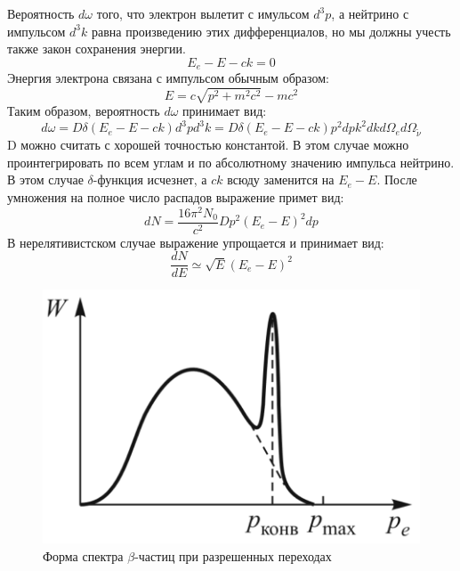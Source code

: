 \documentclass[a4paper, 12pt]{article}
\begin{document}
		Вероятность $d\omega$ того, что электрон вылетит с имульсом $d^3p$, а нейтрино с импульсом $d^3k$ равна произведению этих дифференциалов, но мы должны учесть также закон сохранения энергии.
		\begin{equation}
		    E_e - E - ck = 0
		\end{equation}
		Энергия электрона связана с импульсом обычным образом:
		\begin{equation}
			\label{pToEConversion}
		    E = c\sqrt{p^2 + m^2c^2} -mc^2
		\end{equation}
		Таким образом, вероятность $d\omega$ принимает вид:
		\begin{equation}
		    d\omega = D\delta(E_e-E-ck)d^3pd^3k = D\delta(E_e-E-ck)p^2d pk^2d kd\Omega_ed\Omega_{\widetilde{\nu}}
		\end{equation}
		D можно считать с хорошей точностью константой. В этом случае можно проинтегрировать по всем углам и по абсолютному значению импульса нейтрино. В этом случае $\delta$-функция исчезнет, а $ck$ всюду заменится на $E_e-E$. После умножения на полное число распадов выражение примет вид:
		\begin{equation}
		    d N = \frac{16\pi^2N_0}{c^2} D p^2\left(E_e-E\right)^2d p
		\end{equation}
		В нерелятивистском случае выражение упрощается и принимает вид:
		\begin{equation}
			\frac{d N}{d E} \simeq \sqrt{E}(E_e - E)^2
		\end{equation} 
		\begin{figure}[h!]
			\centering
			\includegraphics[width=0.6\linewidth]{pic1}
			\caption{Форма спектра $\beta$-частиц при разрешенных переходах}
		\end{figure}
\end{document}

